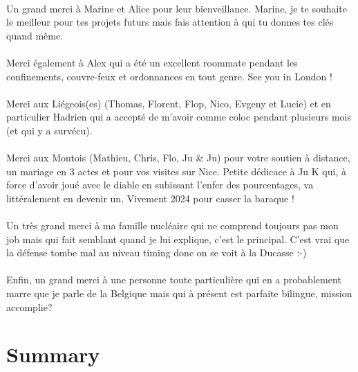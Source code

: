 \documentclass[a4paper]{report}
\begin{document}
\\
Un grand merci à Marine et Alice pour leur bienveillance. Marine, je te souhaite le meilleur pour tes projets futurs mais fais attention à qui tu donnes tes clés quand même.\\
\\
Merci également à Alex qui a été un excellent roommate pendant les confinements, couvre-feux et ordonnances en tout genre. See you in London !\\
\\
Merci aux Liégeois(es) (Thomas, Florent, Flop, Nico, Evgeny et Lucie) et en particulier Hadrien qui a accepté de m'avoir comme coloc pendant plusieurs mois (et qui y a survécu).\\
\\
Merci aux Montois (Mathieu, Chris, Flo, Ju \& Ju) pour votre soutien à distance, un mariage en 3 actes et pour vos visites sur Nice. Petite dédicace à Ju K qui, à force d'avoir joué avec le diable en subissant l'enfer des pourcentages, va littéralement en devenir un. Vivement 2024 pour casser la baraque !\\
\\
Un très grand merci à ma famille nucléaire qui ne comprend toujours pas mon job mais qui fait semblant quand je lui explique, c'est le principal. C'est vrai que la défense tombe mal au niveau timing donc on se voit à la Ducasse :-)\\
\\
Enfin, un grand merci à une personne toute particulière qui en a probablement marre que je parle de la Belgique mais qui à présent est parfaite bilingue, mission accomplie?

\newpage
\thispagestyle{empty}
\null

\newpage
\thispagestyle{empty}
\null

\section*{Summary}
\end{document}
